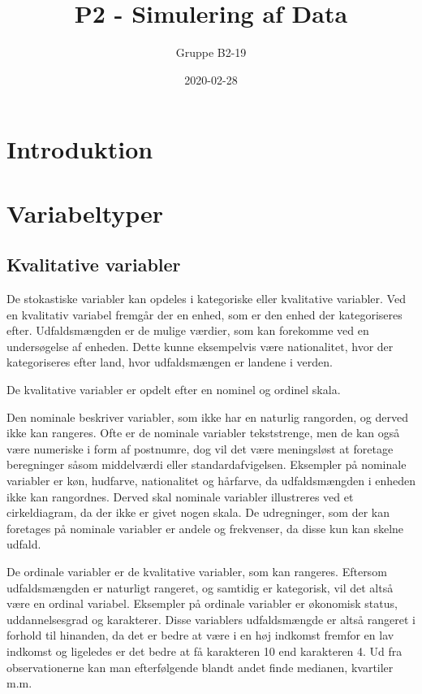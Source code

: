 \documentclass[]{book}
\title{P2 - Simulering af Data}
\author{Gruppe B2-19}
\date{2020-02-28}
\theoremstyle{definition}
\theoremstyle{definition}
\theoremstyle{definition}
\theoremstyle{remark}
\begin{document}
\maketitle

{
\setcounter{tocdepth}{1}
\tableofcontents
}
\hypertarget{introduktion}{%
\chapter{Introduktion}\label{introduktion}}

\hypertarget{variabeltyper}{%
\chapter{Variabeltyper}\label{variabeltyper}}

\hypertarget{kvalitative-variabler}{%
\section{Kvalitative variabler}\label{kvalitative-variabler}}

De stokastiske variabler kan opdeles i kategoriske eller kvalitative variabler. Ved en kvalitativ variabel fremgår der en enhed, som er den enhed der kategoriseres efter. Udfaldsmængden er de mulige værdier, som kan forekomme ved en undersøgelse af enheden. Dette kunne eksempelvis være nationalitet, hvor der kategoriseres efter land, hvor udfaldsmængen er landene i verden.

De kvalitative variabler er opdelt efter en nominel og ordinel skala.

Den nominale beskriver variabler, som ikke har en naturlig rangorden, og derved ikke kan rangeres. Ofte er de nominale variabler tekststrenge, men de kan også være numeriske i form af postnumre, dog vil det være meningsløst at foretage beregninger såsom middelværdi eller standardafvigelsen. Eksempler på nominale variabler er køn, hudfarve, nationalitet og hårfarve, da udfaldsmængden i enheden ikke kan rangordnes. Derved skal nominale variabler illustreres ved et cirkeldiagram, da der ikke er givet nogen skala. De udregninger, som der kan foretages på nominale variabler er andele og frekvenser, da disse kun kan skelne udfald.

De ordinale variabler er de kvalitative variabler, som kan rangeres. Eftersom udfaldsmængden er naturligt rangeret, og samtidig er kategorisk, vil det altså være en ordinal variabel. Eksempler på ordinale variabler er økonomisk status, uddannelsesgrad og karakterer. Disse variablers udfaldsmængde er altså rangeret i forhold til hinanden, da det er bedre at være i en høj indkomst fremfor en lav indkomst og ligeledes er det bedre at få karakteren 10 end karakteren 4. Ud fra observationerne kan man efterfølgende blandt andet finde medianen, kvartiler m.m.
\end{document}
